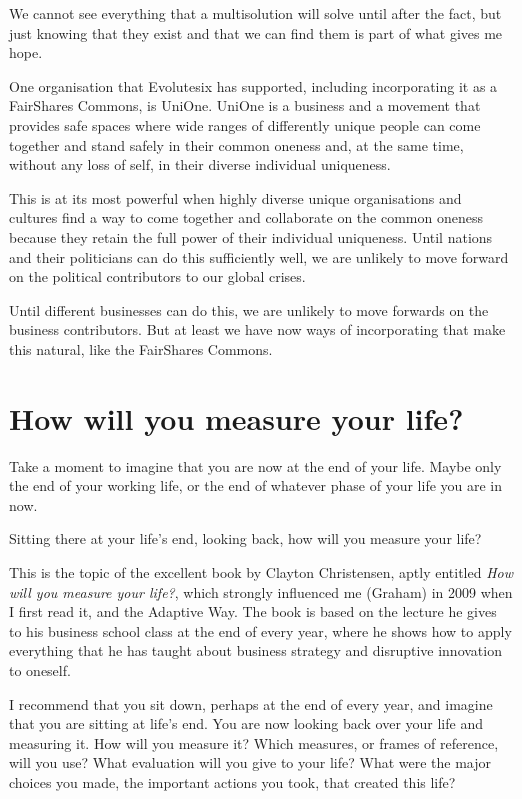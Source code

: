 We cannot see everything that a multisolution will solve until after the fact, but just knowing that they exist and that we can find them is part of what gives me hope.


One organisation that Evolutesix has supported, including incorporating it as a FairShares Commons, is UniOne. UniOne is a business and a movement that provides safe spaces where wide ranges of differently unique people can come together and stand safely in their common oneness and, at the same time, without any loss of self, in their diverse individual uniqueness.


This is at its most powerful when highly diverse unique organisations and cultures find a way to come together and collaborate on the common oneness because they retain the full power of their individual uniqueness. Until nations and their politicians can do this sufficiently well, we are unlikely to move forward on the political contributors to our global crises.


Until different businesses can do this, we are unlikely to move forwards on the business contributors. But at least we have now ways of incorporating that make this natural, like the FairShares Commons.


\section{How will you measure your life?}
Take a moment to imagine that you are now at the end of your life. Maybe only the end of your working life, or the end of whatever phase of your life you are in now. 


Sitting there at your life’s end, looking back, how will you measure your life?


This is the topic of the excellent book\cite{christensen-measure} by Clayton Christensen, aptly entitled \emph{How will you measure your life?}, which strongly influenced me (Graham) in 2009 when I first read it, and the  Adaptive Way. The book is based on the lecture he gives to his business school class at the end of every year, where he shows how to apply everything that he has taught about business strategy and disruptive innovation\cite{christensen-dna} to oneself.


I recommend that you sit down, perhaps at the end of every year, and imagine that you are sitting at life’s end. You are now looking back over your life and measuring it. How will you measure it? Which measures, or frames of reference, will you use? What evaluation will you give to your life? What were the major choices you made, the important actions you took, that created this life?


